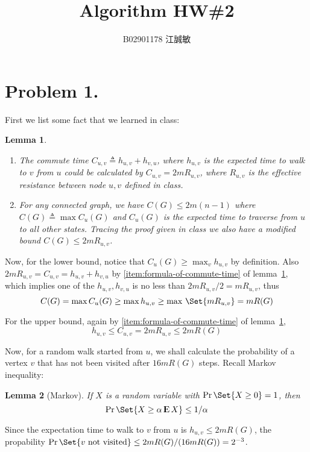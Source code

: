 \documentclass[12pt, a4paper]{article}
\title{Algorithm HW\#2}
\author{B02901178 江誠敏}
\newtheorem{lemma}{Lemma}
\newcommand{\defeq}{\triangleq}
\DeclareMathOperator{\Expect}{{\rm I\kern-.3em E}}
\begin{document}
\maketitle
\section{Problem 1.}

First we list some fact that we learned in class: \smallskip

\begin{lemma} \label{lemma:what-we-learn} \hfill
  \begin{enumerate}[label=(\arabic*)]
    \item The commute time $C_{u, v} \defeq h_{u, v} + h_{v, u}$, where
      $h_{u, v}$ is the expected time to walk to $v$ from $u$ could be
      calculated by $C_{u, v} = 2 m R_{u, v}$, where $R_{u, v}$ is
      the effective resistance between node $u, v$ defined in class.
      \label{item:formula-of-commute-time}
    \item For any connected graph, we have $C(G) \leq 2m(n-1)$ where
      $C(G) \defeq \max C_u(G)$ and $C_u(G)$ is the expected
      time to traverse from $u$ to all other states.
      Tracing the proof given in class we also have a
      modified bound $C(G) \leq 2 m R_{u, v}$.
      \label{item:bound-of-cover-time}
  \end{enumerate}
\end{lemma}

Now, for the lower bound, notice that $C_u(G) \geq \max_v h_{u, v}$
by definition. Also $2 m R_{u, v} = C_{u, v} = h_{u, v} + h_{v, u}$
by \ref{item:formula-of-commute-time} of lemma~\ref{lemma:what-we-learn},
which implies one of the $h_{u, v}, h_{v, u}$ is no less than
$2 m R_{u, v} / 2 = m R_{u, v}$, thus
\[ C(G) = \max C_u(G) \geq \max h_{u, v} \geq \max \,\Set{ m R_{u, v} } = m R(G) \]

For the upper bound, again
by \ref{item:formula-of-commute-time} of lemma~\ref{lemma:what-we-learn},
\[ h_{u, v} \leq C_{u, v} = 2m R_{u, v} \leq 2 m R(G) \]

Now, for a random walk started from $u$,
we shall calculate the probability of a vertex $v$ that has not been visited
after $16 m R(G)$ steps. Recall Markov inequality: \smallskip
\begin{lemma}[Markov]
  If $X$ is a random variable with $\Pr\Set{ X \geq 0 } = 1$, then
  \[ \Pr \Set{X \geq \alpha \Expect X} \leq 1 / \alpha \]
\end{lemma}
Since the expectation time to walk to $v$ from $u$ is $h_{u, v} \leq 2 m R(G)$,
the propability $\Pr\Set{ v \text{ not visited}} \leq 2 m R(G) / (16 m R(G)) = 2^{-3}$.
\end{document}
